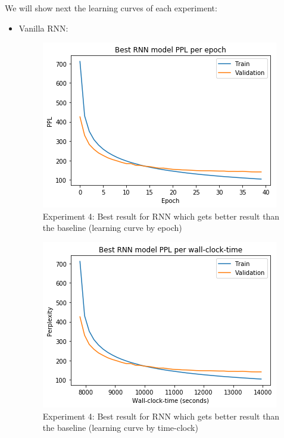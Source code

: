 We will show next the learning curves of each experiment:
\begin{itemize}
	\item Vanilla RNN:
	\begin{figure}[H]
		\centering
		\includegraphics[scale=0.8]{Q4-3_RNN_1epoch.png}
		\caption{Experiment 4: Best result for RNN which gets better result than the baseline (learning curve by epoch)}
		\label{fig:fig20}
	\end{figure}
\begin{figure}[H]
	\centering
	\includegraphics[scale=0.8]{Q4-3_RNN_1time.png}
	\caption{Experiment 4: Best result for RNN which gets better result than the baseline (learning curve by time-clock)}
	\label{fig:fig20b}
\end{figure}
	

\end{itemize}
